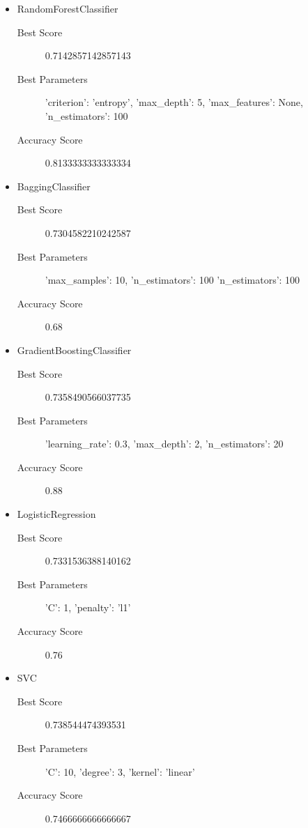 \begin{itemize}
	\item RandomForestClassifier
	
	\begin{description}
		\item[Best Score] 0.7142857142857143
		\item[Best Parameters] 'criterion': 'entropy', 'max_depth': 5, 'max_features': None, 'n_estimators': 100
		\item[Accuracy Score] 0.8133333333333334
	\end{description}
	
	\item BaggingClassifier
	
	\begin{description}
		\item[Best Score] 0.7304582210242587
		\item[Best Parameters] 'max_samples': 10, 'n_estimators': 100 'n_estimators': 100
		\item[Accuracy Score] 0.68
	\end{description}
	
	\item GradientBoostingClassifier
	
	\begin{description}
		\item[Best Score] 0.7358490566037735
		\item[Best Parameters] 'learning_rate': 0.3, 'max_depth': 2, 'n_estimators': 20
		\item[Accuracy Score] 0.88
	\end{description}
	
	\item LogisticRegression
	
	\begin{description}
		\item[Best Score] 0.7331536388140162
		\item[Best Parameters] 'C': 1, 'penalty': 'l1'
		\item[Accuracy Score] 0.76
	\end{description}
	
	\item SVC
	
	\begin{description}
		\item[Best Score] 0.738544474393531
		\item[Best Parameters] 'C': 10, 'degree': 3, 'kernel': 'linear'
		\item[Accuracy Score] 0.7466666666666667
	\end{description}
	

\end{itemize}
